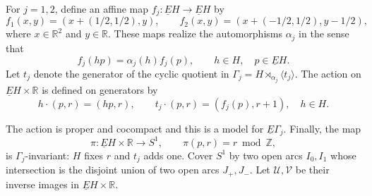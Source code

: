\documentclass[11pt]{amsart}
\newcommand{\Z}{\mathbb Z}
\newcommand{\R}{\mathbb R}
\newcommand{\diag}{\operatorname{diag}}
\theoremstyle{remark}
\numberwithin{equation}{section}
\begin{document}
For $j=1,2$, define an affine map
$f_j\colon\underline EH\to\underline EH$ by
\[
 f_1(x,y)=(x+(1/2,1/2),y),\qquad
 f_2(x,y)=(x+(-1/2,1/2),y-1/2),
\]
where $x\in\R^2$ and $y\in\R$. These maps realize the automorphisms $\alpha_j$ in the sense that
\begin{equation*}
 f_j(hp)=\alpha_j(h)f_j(p),
 \qquad h\in H,\quad p\in\underline EH.
\end{equation*}
Let $t_j$ denote the generator of the cyclic quotient in
$\Gamma_j=H\rtimes_{\alpha_j}\langle t_j\rangle$. The action on
$\underline EH\times\R$ is defined on generators by
\[
 h\cdot(p,r)=(hp,r),\qquad
 t_j\cdot(p,r)=(f_j(p),r+1),
 \quad h\in H.
\]

The action is proper and cocompact and this is a model for $\underline E\Gamma_j$. Finally, the
map
\[
 \pi\colon\underline EH\times\R\longrightarrow S^1,\qquad
 \pi(p,r)=r\bmod\Z,
\]
is $\Gamma_j$-invariant: $H$ fixes $r$ and $t_j$ adds one. Cover $S^1$ by two open arcs
$I_0,I_1$ whose intersection is the disjoint union of two open arcs
$J_+,J_-$. Let $\mathcal U,\mathcal V$ be their inverse images in
$\underline EH\times\R$.
\end{document}
